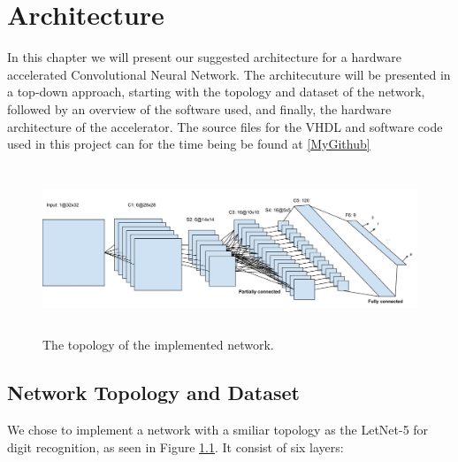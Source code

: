 \chapter{Architecture} \label{architecture}

In this chapter we will present our suggested architecture for a hardware accelerated Convolutional Neural Network. The architecuture will be presented in a top-down approach, starting with the topology and dataset of the network, followed by an overview of the software used, and finally, the hardware architecture of the accelerator. The source files for the VHDL and software code used in this project can for the time being be found at \ref{MyGithub}

\begin{figure}[h!]
  \centering
      \includegraphics[width=1.2\textwidth, height=5cm]{Figures/Method/Network_topology}
    \caption{The topology of the implemented network.}
    \label{fig_network_topology}
\end{figure}

\section{Network Topology and Dataset}

We chose to implement a network with a smiliar topology as the LetNet-5 for digit recognition, as seen in Figure \ref{fig_network_topology}. It consist of six layers: 


